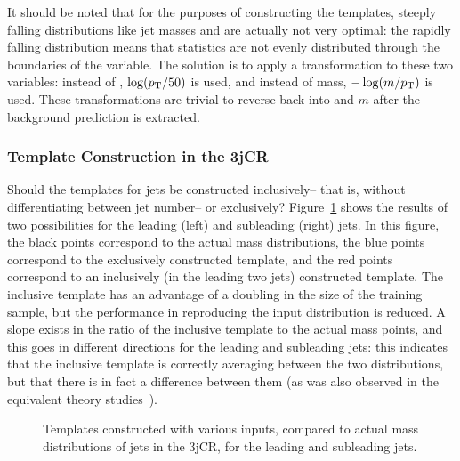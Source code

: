 It should be noted that for the purposes of constructing the templates, steeply falling distributions like jet masses and \pt are actually not very optimal: the rapidly falling distribution means that statistics are not evenly distributed through the boundaries of the variable. The solution is to apply a transformation to these two variables: instead of \pt, $\log(p_{\text{T}}/50)$ is used, and instead of mass, $-\log(m/p_{\text{T}})$ is used. These transformations are trivial to reverse back into \pt and $m$ after the background prediction is extracted.

\subsubsection{Template Construction in the 3jCR}

Should the templates for jets be constructed inclusively-- that is, without differentiating between jet number-- or exclusively? Figure~\ref{fig:search:search:background:3jCR} shows the results of two possibilities for the leading (left) and subleading (right) jets.  In this figure, the black points correspond to the actual mass distributions, the blue points correspond to the exclusively constructed template, and the red points correspond to an inclusively (in the leading two jets) constructed template. The inclusive template has an advantage of a doubling in the size of the training sample, but the performance in reproducing the input distribution is reduced. A slope exists in the ratio of the inclusive template to the actual mass points, and this goes in different directions for the leading and subleading jets: this indicates that the inclusive template is correctly averaging between the two distributions, but that there is in fact a difference between them (as was also observed in the equivalent theory studies~\cite{MassTemplates}).


\begin{figure}[!ht]
  \centering
    \caption{Templates constructed with various inputs, compared to actual mass distributions of jets in the 3jCR, for the leading and subleading jets.}
  \label{fig:search:search:background:3jCR}
\end{figure}

